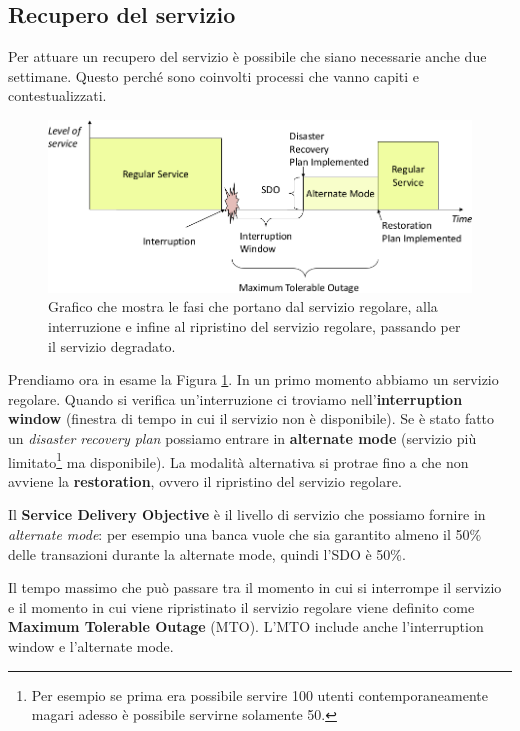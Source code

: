 \subsection{Recupero del servizio}

Per attuare un recupero del servizio è possibile che siano necessarie anche due
settimane.
Questo perché sono coinvolti processi che vanno capiti e contestualizzati.

\begin{figure}[h!]
        \begin{center}
                \includegraphics[scale=0.65]{res/img/recovery-times.png}
        \end{center}
        \caption{Grafico che mostra le fasi che portano dal servizio
        regolare, alla interruzione e infine al ripristino del servizio
        regolare, passando per il servizio degradato.}
        \label{fig:recovery-times}
\end{figure}

Prendiamo ora in esame la Figura \ref{fig:recovery-times}. In un primo 
momento abbiamo un servizio regolare. Quando si verifica un'interruzione
ci troviamo nell'\textbf{in\-ter\-rup\-tion win\-dow} (finestra di tempo 
in cui il servizio non è disponibile). Se è stato fatto un 
\textit{disaster recovery plan} possiamo entrare in 
\textbf{alternate mode} (servizio più limitato\footnote{Per 
esempio se prima era possibile servire 100 utenti contemporaneamente 
magari adesso \`e possibile servirne solamente 50.} ma disponibile).
La modalità alternativa si protrae fino a che non avviene la 
\textbf{restoration},
ovvero il ripristino del servizio regolare.

Il \textbf{Service Delivery Objective} è il livello di servizio che possiamo
fornire in \textit{alternate mode}: per esempio una banca vuole che sia
garantito almeno il 50\% delle transazioni durante la alternate mode, quindi
l'SDO è 50\%.

Il tempo massimo che può passare tra il momento in cui si interrompe il
servizio e il momento in cui viene ripristinato il servizio regolare
viene definito come \textbf{Max\-i\-mum Tol\-er\-a\-ble Out\-age} (MTO).
L'MTO include anche l'interruption window e l'alternate mode.

